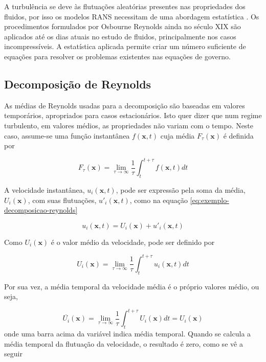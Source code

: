 A turbulência se deve às flutuações aleatórias presentes nas propriedades dos fluidos, por isso os modelos RANS necessitam de uma abordagem estatística \cite{Wilcox2006}. Os procedimentos formulados por Osbourne Reynolds ainda no século XIX são aplicados até os dias atuais no estudo de fluidos, principalmente nos casos incompressíveis. A estatística aplicada permite criar um número suficiente de equações para resolver os problemas existentes nas equações de governo.

\subsection{Decomposição de Reynolds}

As médias de Reynolds usadas para a decomposição são baseadas em valores temporários, apropriados para casos estacionários. Isto quer dizer que num regime turbulento, em valores médios, as propriedades não variam com o tempo. Neste caso, assume-se uma função instantânea \(f(\textbf{x},t)\) cuja média \(F_{\tau}(\textbf{x})\) é definida por

\begin{equation}
	F_{\tau}(\textbf{x}) = \lim_{\tau \rightarrow \infty} \frac{1}{\tau}\int_{t}^{t+\tau}f(\textbf{x},t)dt
\end{equation}

A velocidade instantânea, \(u_i(\textbf{x},t)\), pode ser expressão pela soma da média, \(U_i(\textbf{x})\), com suas flutuações, \(u'_i(\textbf{x},t)\), como na equação \ref{eq:exemplo-decomposicao-reynolds}

\begin{equation}
	\label{eq:exemplo-decomposicao-reynolds}
	u_{i}(\textbf{x},t) = U_{i}(\textbf{x}) + u'_{i}(\textbf{x},t)
\end{equation} 

Como \(U_{i}(\textbf{x})\) é o valor médio da velocidade, pode ser definido por 

\begin{equation}
	U_{i}(\textbf{x}) = \lim_{\tau \rightarrow \infty} \frac{1}{\tau}\int_{t}^{t+\tau}u_i(\textbf{x},t)dt
\end{equation}

Por sua vez, a média temporal da velocidade média é o próprio valores médio, ou seja,

\begin{equation}
	\overline{U_{i}}(\textbf{x}) = \lim_{\tau \rightarrow \infty} \frac{1}{\tau}\int_{t}^{t+\tau}U_i(\textbf{x})dt = U_i(\textbf{x})
\end{equation}
%
onde uma barra acima da variável indica média temporal. Quando se calcula a média temporal da flutuação da velocidade, o resultado é zero, como se vê a seguir

